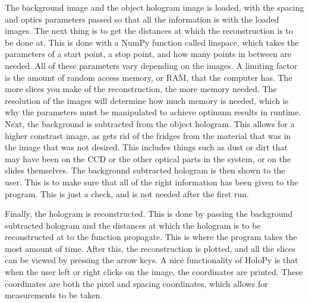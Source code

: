 The background image and the object hologram image is
loaded, with the spacing and optics parameters passed so that all the
information is with the loaded images. The next thing is to get the distances
at which the reconstruction is to be done at. This is done with a NumPy
function called linspace, which takes the parameters of a start point, a stop
point, and how many points in between are needed. All of these parameters vary
depending on the images. A limiting factor is the amount of random access
memory, or RAM, that the computer has. The more slices you make of the
reconstruction, the more memory needed. The resolution of the images will
determine how much memory is needed, which is why the parameters must be
manipulated to achieve optimum results in runtime. Next, the background is
subtracted from the object hologram. This allows for a higher constrast image,
as gets rid of the fridges from the material that was in the image that was not
desired. This includes things such as dust or dirt that may have been on the
CCD or the other optical parts in the system, or on the slides themselves.
The background subtracted hologram is then shown to the user. This is to make
sure that all of the right information has been given to the program. This is
just a check, and is not needed after the first run.

Finally, the hologram is
reconstructed. This is done by passing the background subtracted hologram and
the distances at which the hologram is to be reconstructed at to the function
propagate. This is where the program takes the most amount of time. After this,
the reconstruction is plotted, and all the slices can be viewed by pressing the
arrow keys. A nice functionality of HoloPy is that when the user left or right
clicks on the image, the coordinates are printed. These coordinates are both
the pixel and spacing coordinates, which allows for measurements to be taken.

















%
%


% 
